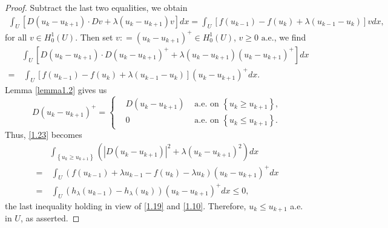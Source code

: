 \documentclass[11pt,a4paper,center,notitlepage]{article}
\numberwithin{equation}{section}
\begin{document}
\begin{proof}
Subtract the last two equalities, we obtain
\begin{align}
\int_U {\left[ {D\left( {{u_k} - {u_{k + 1}}} \right) \cdot Dv + \lambda \left( {{u_k} - {u_{k + 1}}} \right)v} \right]dx}  = \int_U {\left[ {f\left( {{u_{k - 1}}} \right) - f\left( {{u_k}} \right) + \lambda \left( {{u_{k - 1}} - {u_k}} \right)} \right]vdx} ,
\end{align}
for all $v \in H_0^1\left( U \right)$. Then set $v: = {\left( {{u_k} - {u_{k + 1}}} \right)^ + } \in H_0^1\left( U \right)$, $v \ge 0 \mbox{ a.e.}$, we find
\begin{align}
\label{1.23}
& \int_U {\left[ {D\left( {{u_k} - {u_{k + 1}}} \right) \cdot D{{\left( {{u_k} - {u_{k + 1}}} \right)}^ + } + \lambda \left( {{u_k} - {u_{k + 1}}} \right){{\left( {{u_k} - {u_{k + 1}}} \right)}^ + }} \right]dx} \nonumber \\
 =&\ \int_U {\left[ {f\left( {{u_{k - 1}}} \right) - f\left( {{u_k}} \right) + \lambda \left( {{u_{k - 1}} - {u_k}} \right)} \right]{{\left( {{u_k} - {u_{k + 1}}} \right)}^ + }dx} .
\end{align}
Lemma \ref{lemma1.2} gives us
\begin{equation}
D{\left( {{u_k} - {u_{k + 1}}} \right)^ + } = \left\{ \begin{split}
& D\left( {{u_k} - {u_{k + 1}}} \right) & \mbox{ a.e. on } \left\{ {{u_k} \ge {u_{k + 1}}} \right\},\\
& 0 & \mbox{ a.e. on } \left\{ {{u_k} \le {u_{k + 1}}} \right\}.
\end{split} \right.
\end{equation}
Thus, \eqref{1.23} becomes
\begin{align}
& \int_{\left\{ {{u_k} \ge {u_{k + 1}}} \right\}} {\left( {{{\left| {D\left( {{u_k} - {u_{k + 1}}} \right)} \right|}^2} + \lambda {{\left( {{u_k} - {u_{k + 1}}} \right)}^2}} \right)dx} \\
 =&\ \int_U {\left( {f\left( {{u_{k - 1}}} \right) + \lambda {u_{k - 1}} - f\left( {{u_k}} \right) - \lambda {u_k}} \right){{\left( {{u_k} - {u_{k + 1}}} \right)}^ + }dx} \\
 =&\ \int_U {\left( {{h_\lambda }\left( {{u_{k - 1}}} \right) - {h_\lambda }\left( {{u_k}} \right)} \right){{\left( {{u_k} - {u_{k + 1}}} \right)}^ + }dx}  \le 0,
\end{align}
the last inequality holding in view of \eqref{1.19} and \eqref{1.10}. Therefore, $u_k\le u_{k+1}$ a.e. in $U$, as asserted.


\end{proof}
\end{document}
